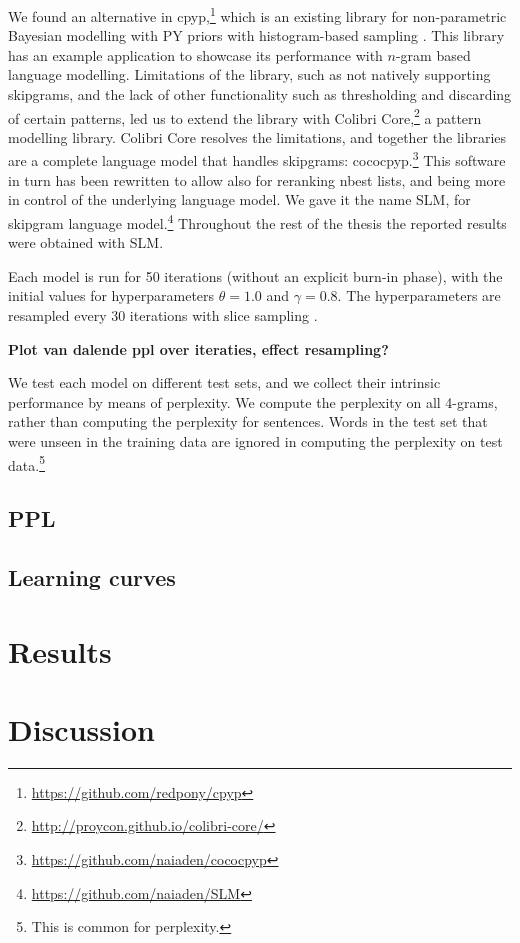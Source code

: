We found an alternative in cpyp,\footnote{\url{https://github.com/redpony/cpyp}} which is an existing library for non-parametric Bayesian modelling with PY priors with histogram-based sampling \cite{blunsom2009note}. This library has an example application to showcase its performance with $n$-gram based language modelling. Limitations of the library, such as not natively supporting skipgrams, and the lack of other functionality such as thresholding and discarding of certain patterns, led us to extend the library with Colibri Core,\footnote{\url{http://proycon.github.io/colibri-core/}} a pattern modelling library. Colibri Core resolves the limitations, and together the libraries are a complete language model that handles skipgrams: cococpyp.\footnote{\url{https://github.com/naiaden/cococpyp}} This software in turn has been rewritten to allow also for reranking nbest lists, and being more in control of the underlying language model. We gave it the name SLM, for skipgram language model.\footnote{\url{https://github.com/naiaden/SLM}} Throughout the rest of the thesis the reported results were obtained with SLM.

  Each model is run for 50 iterations (without an explicit burn-in phase), with the initial values for hyperparameters $\theta=1.0$ and $\gamma=0.8$. The hyperparameters are resampled every 30 iterations with slice sampling \cite{walker2007sampling}.
  
  \textbf{Plot van dalende ppl over iteraties, effect resampling?}
  
  We test each model on different test sets, and we collect their intrinsic performance by means of perplexity. We compute the perplexity on all 4-grams, rather than computing the perplexity for sentences. 
  Words in the test set that were unseen in the training data are ignored in computing the perplexity on test data.\footnote{This is common for perplexity. }

\subsection{PPL}
\subsection{Learning curves}

\section{Results}

\section{Discussion}
